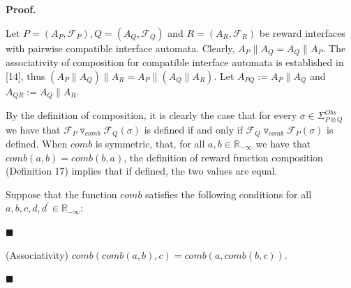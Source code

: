  
 
 
 
\par\medskip\noindent\textbf{Proof.}\par
 
 
Let $P=(A_{P},\mathcal{F}_{P}),Q=(A_{Q},\mathcal{F}_{Q})$ and $R=(A_{R},\mathcal{F}_{R})$ be reward interfaces with pairwise compatible interface automata. Clearly, $A_{P}\parallel A_{Q}=A_{Q}\parallel A_{P}$. The associativity of composition for compatible interface automata is established in [14], thus $(A_{P}\parallel A_{Q})\parallel A_{R}=A_{P}\parallel(A_{Q}\parallel A_{R})$. Let $A_{PQ}:=A_{P}\parallel A_{Q}$ and $A_{QR}:=A_{Q}\parallel A_{R}$.\par
 
 
 
By the definition of composition, it is clearly the case that for every $\sigma\in\Sigma_{P\otimes Q}^{Obs}$ we have that ${{\mathcal{F}_{P}}\mathbin{\triangledown_{\mathit{comb}}}{\mathcal{F}_{Q}}}(\sigma)$ is defined if and only if ${{\mathcal{F}_{Q}}\mathbin{\triangledown_{\mathit{comb}}}{\mathcal{F}_{P}}}(\sigma)$ is defined. When $\mathit{comb}$ is symmetric, that, for all $a,b\in\mathbb{R}_{-\infty}$ we have that $\mathit{comb}(a,b)=\mathit{comb}(b,a)$, the definition of reward function composition (Definition 17) implies that if defined, the two values are equal.\par
 
 
 
Suppose that the function $\mathit{comb}$ satisfies the following conditions for all $a,b,c,d,d^{\prime}\in\mathbb{R}_{-\infty}$:\par
  
\par\noindent  $\blacksquare$ 
 
(Associativity) $\mathit{comb}(comb(a,b),c)=\mathit{comb}(a,comb(b,c))$.\par
 
 
 
\par\noindent  $\blacksquare$ 
 
